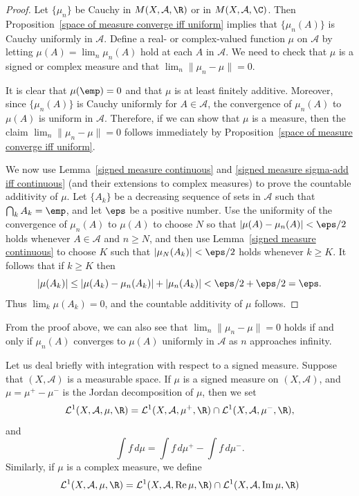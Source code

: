 \begin{proof}
Let $\{\mu_n\}$ be Cauchy in $M(X,\mathcal{A},\R)$ or in $M(X,\mathcal{A},\C)$. Then Proposition~\ref{space of measure converge iff uniform} implies that $\{\mu_n(A)\}$ is Cauchy uniformly in $\mathcal{A}$. Define a real- or complex-valued function $\mu$ on $\mathcal{A}$ by letting $\mu(A)=\lim_n\mu_n(A)$ hold at each $A$ in $\mathcal{A}$. We need to check that $\mu$ is a signed or complex measure and that $\lim_n\|\mu_n-\mu\|=0$.\par
It is clear that $\mu(\emp)=0$ and that $\mu$ is at least finitely additive. Moreover, since $\{\mu_n(A)\}$ is Cauchy uniformly for $A\in\mathcal{A}$, the convergence of $\mu_n(A)$ to $\mu(A)$ is uniform in $\mathcal{A}$. Therefore, if we can show that $\mu$ is a measure, then the claim $\lim_n\|\mu_n-\mu\|=0$ follows immediately by Proposition~\ref{space of measure converge iff uniform}.\par
We now use Lemma~\ref{signed measure continuous} and \ref{signed measure sigma-add iff continuous} (and their extensions to complex measures) to prove the countable additivity of $\mu$. Let $\{A_k\}$ be a decreasing sequence of sets in $\mathcal{A}$ such that $\bigcap_kA_k=\emp$, and let $\eps$ be a positive number. Use the uniformity of the convergence of $\mu_n(A)$ to $\mu(A)$ to choose $N$ so that $|\mu(A)-\mu_n(A)|<\eps/2$ holds whenever $A\in\mathcal{A}$ and $n\geq N$, and then use Lemma~\ref{signed measure continuous} to choose $K$ such that $|\mu_N(A_k)|<\eps/2$ holds whenever $k\geq K$. It follows that if $k\geq K$ then
\[|\mu(A_k)|\leq|\mu(A_k)-\mu_n(A_k)|+|\mu_n(A_k)|<\eps/2+\eps/2=\eps.\]
Thus $\lim_k\mu(A_k)=0$, and the countable additivity of $\mu$ follows.
\end{proof}
\begin{remark}
From the proof above, we can also see that $\lim_n\|\mu_n-\mu\|=0$ holds if and only if $\mu_n(A)$ converges to $\mu(A)$ uniformly in $\mathcal{A}$ as $n$ approaches infinity.
\end{remark}
Let us deal briefly with integration with respect to a signed measure. Suppose that $(X,\mathcal{A})$ is a measurable space. If $\mu$ is a signed measure on $(X,\mathcal{A})$, and $\mu=\mu^+-\mu^-$ is the Jordan decomposition of $\mu$, then we set 
\[\mathcal{L}^1(X,\mathcal{A},\mu,\R)=\mathcal{L}^1(X,\mathcal{A},\mu^+,\R)\cap\mathcal{L}^1(X,\mathcal{A},\mu^-,\R),\]
and
\[\int f\,d\mu=\int f\,d\mu^+-\int f\,d\mu^-.\]
Similarly, if $\mu$ is a complex measure, we define
\[\mathcal{L}^1(X,\mathcal{A},\mu,\R)=\mathcal{L}^1(X,\mathcal{A},\mathrm{Re}\,\mu,\R)\cap \mathcal{L}^1(X,\mathcal{A},\mathrm{Im}\,\mu,\R)\]

